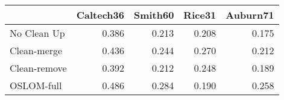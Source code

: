 \begin{tabular}{lrrrr}
\toprule
{} & Caltech36 & Smith60 & Rice31 & Auburn71 \\
\midrule
No Clean Up  &     0.386 &   0.213 &  0.208 &    0.175 \\
Clean-merge  &     0.436 &   0.244 &  0.270 &    0.212 \\
Clean-remove &     0.392 &   0.212 &  0.248 &    0.189 \\
OSLOM-full   &     0.486 &   0.284 &  0.190 &    0.258 \\
\bottomrule
\end{tabular}
